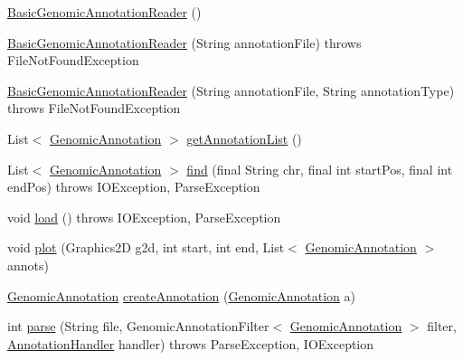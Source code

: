 \begin{DoxyCompactItemize}
\item 
\hyperlink{classbroad_1_1core_1_1annotation_1_1_basic_genomic_annotation_reader_ac585c25b84a23eb80327480d48f63dae}{Basic\+Genomic\+Annotation\+Reader} ()
\item 
\hyperlink{classbroad_1_1core_1_1annotation_1_1_basic_genomic_annotation_reader_a2b981fb1ebbd1367037db76636747f15}{Basic\+Genomic\+Annotation\+Reader} (String annotation\+File)  throws File\+Not\+Found\+Exception 
\item 
\hyperlink{classbroad_1_1core_1_1annotation_1_1_basic_genomic_annotation_reader_a32290d7f7cec4e53b87de92baeaea80b}{Basic\+Genomic\+Annotation\+Reader} (String annotation\+File, String annotation\+Type)  throws File\+Not\+Found\+Exception
\item 
List$<$ \hyperlink{interfacebroad_1_1core_1_1annotation_1_1_genomic_annotation}{Genomic\+Annotation} $>$ \hyperlink{classbroad_1_1core_1_1annotation_1_1_basic_genomic_annotation_reader_ab9dfb0f9f5faecc81d703550f7c1afed}{get\+Annotation\+List} ()
\item 
List$<$ \hyperlink{interfacebroad_1_1core_1_1annotation_1_1_genomic_annotation}{Genomic\+Annotation} $>$ \hyperlink{classbroad_1_1core_1_1annotation_1_1_basic_genomic_annotation_reader_a3ec199e617e72b8737dd62b488cd2ecd}{find} (final String chr, final int start\+Pos, final int end\+Pos)  throws I\+O\+Exception, Parse\+Exception 
\item 
void \hyperlink{classbroad_1_1core_1_1annotation_1_1_basic_genomic_annotation_reader_a4243e5e53cf2ca334e5f5b7589227694}{load} ()  throws I\+O\+Exception, Parse\+Exception  
\item 
void \hyperlink{classbroad_1_1core_1_1annotation_1_1_basic_genomic_annotation_reader_a3fd19c0d4a053fb55444012952267dc0}{plot} (Graphics2\+D g2d, int start, int end, List$<$ \hyperlink{interfacebroad_1_1core_1_1annotation_1_1_genomic_annotation}{Genomic\+Annotation} $>$ annots)
\item 
\hyperlink{interfacebroad_1_1core_1_1annotation_1_1_genomic_annotation}{Genomic\+Annotation} \hyperlink{classbroad_1_1core_1_1annotation_1_1_basic_genomic_annotation_reader_a987b7996be954efb377c5911a66d9e28}{create\+Annotation} (\hyperlink{interfacebroad_1_1core_1_1annotation_1_1_genomic_annotation}{Genomic\+Annotation} a)
\item 
int \hyperlink{classbroad_1_1core_1_1annotation_1_1_basic_genomic_annotation_reader_a82ed1b8eec7d6136f102af46c550283f}{parse} (String file, Genomic\+Annotation\+Filter$<$ \hyperlink{interfacebroad_1_1core_1_1annotation_1_1_genomic_annotation}{Genomic\+Annotation} $>$ filter, \hyperlink{interfacebroad_1_1core_1_1annotation_1_1_annotation_handler}{Annotation\+Handler} handler)  throws Parse\+Exception, I\+O\+Exception 

\end{DoxyCompactItemize}
